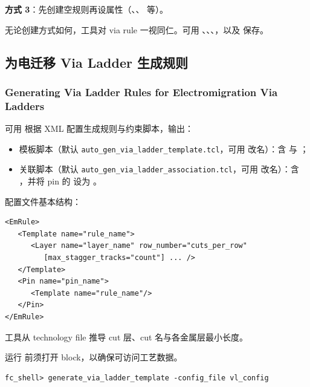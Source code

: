 \textbf{方式 3}：先创建空规则再设属性（、、 等）。

无论创建方式如何，工具对 via rule 一视同仁。可用 、、、，以及  保存。

\subsection{为电迁移 Via Ladder 生成规则}
\subsubsection*{Generating Via Ladder Rules for Electromigration Via Ladders}

可用  根据 XML 配置生成规则与约束脚本，输出：
\begin{itemize}
  \item 模板脚本（默认 \texttt{auto\_gen\_via\_ladder\_template.tcl}，可用  改名）：含  与 ；
  \item 关联脚本（默认 \texttt{auto\_gen\_via\_ladder\_association.tcl}，可用  改名）：含 ，并将 pin 的  设为 。
\end{itemize}

配置文件基本结构：
\begin{lstlisting}
<EmRule>
   <Template name="rule_name">
      <Layer name="layer_name" row_number="cuts_per_row"
         [max_stagger_tracks="count"] ... />
   </Template>
   <Pin name="pin_name">
      <Template name="rule_name"/>
   </Pin>
</EmRule>
\end{lstlisting}

工具从 technology file 推导 cut 层、cut 名与各金属层最小长度。

\begin{noteBox}
运行  前须打开 block，以确保可访问工艺数据。
\end{noteBox}

\begin{lstlisting}
fc_shell> generate_via_ladder_template -config_file vl_config
\end{lstlisting}

